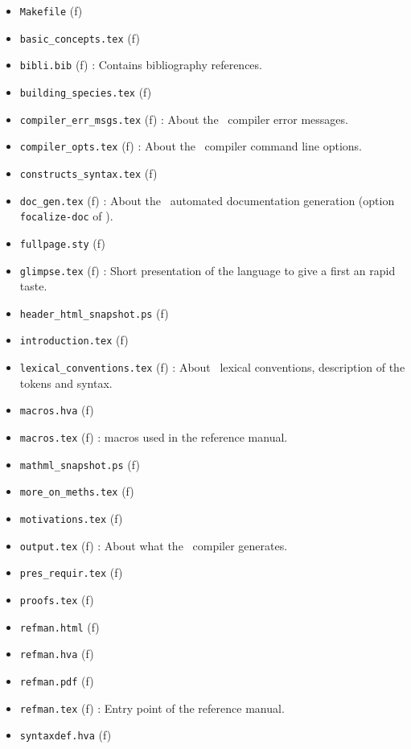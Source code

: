 \begin{itemize}
\begin{itemize}
\begin{itemize}
      \begin{itemize}
      \item {\tt Makefile} (f)
      \item {\tt basic\_concepts.tex} (f)
      \item {\tt bibli.bib} (f) : Contains bibliography references.
      \item {\tt building\_species.tex} (f)
      \item {\tt compiler\_err\_msgs.tex} (f) : About the \focalizec\
        compiler error messages.
      \item {\tt compiler\_opts.tex} (f) : About the \focalizec\
        compiler command line options.
      \item {\tt constructs\_syntax.tex} (f)
      \item {\tt doc\_gen.tex} (f) : About the \focalize\ automated
        documentation generation (option {\tt focalize-doc} of
        \focalizec).
      \item {\tt fullpage.sty} (f)
      \item {\tt glimpse.tex} (f) : Short presentation of the language
        to give a first an rapid taste.
      \item {\tt header\_html\_snapshot.ps} (f)
      \item {\tt introduction.tex} (f)
      \item {\tt lexical\_conventions.tex} (f) : About \focalize\ lexical
        conventions, description of the tokens and syntax.
      \item {\tt macros.hva} (f)
      \item {\tt macros.tex} (f) : \latex macros used in the reference
        manual.
      \item {\tt mathml\_snapshot.ps} (f)
      \item {\tt more\_on\_meths.tex} (f)
      \item {\tt motivations.tex} (f)
      \item {\tt output.tex} (f) : About what the \focalizec\ compiler
        generates.
      \item {\tt pres\_requir.tex} (f)
      \item {\tt proofs.tex} (f)
      \item {\tt refman.html} (f)
      \item {\tt refman.hva} (f)
      \item {\tt refman.pdf} (f)
      \item {\tt refman.tex} (f) : Entry point of the reference manual.
      \item {\tt syntaxdef.hva} (f)

\end{itemize}
\end{itemize}
\end{itemize}
\end{itemize}
